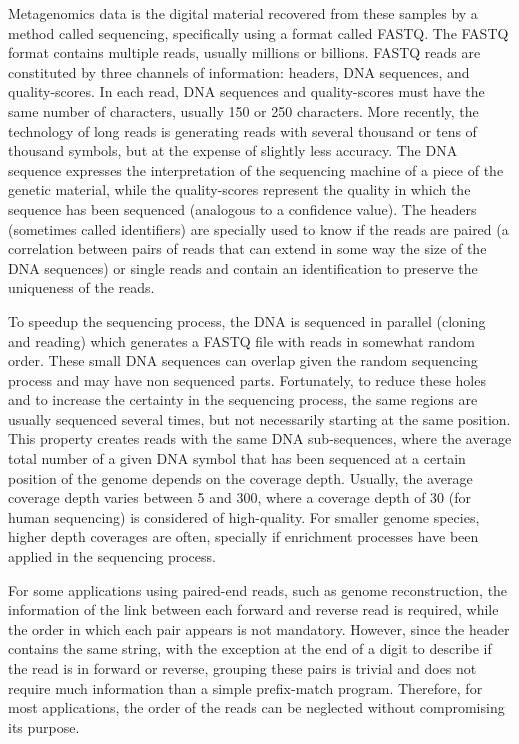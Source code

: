 \documentclass[smallabstract,smallcaptions]{dccpaper}
\begin{document}
Metagenomics data is the digital material recovered from these samples by a method called sequencing, specifically using a format called FASTQ. The FASTQ format contains multiple reads, usually millions or billions. FASTQ reads are constituted by three channels of information: headers, DNA sequences, and quality-scores. In each read, DNA sequences and quality-scores must have the same number of characters, usually 150 or 250 characters. More recently, the technology of long reads is generating reads with several thousand or tens of thousand symbols, but at the expense of slightly less accuracy. The DNA sequence expresses the interpretation of the sequencing machine of a piece of the genetic material, while the quality-scores represent the quality in which the sequence has been sequenced (analogous to a confidence value). The headers (sometimes called identifiers) are specially used to know if the reads are paired (a correlation between pairs of reads that can extend in some way the size of the DNA sequences) or single reads and contain an identification to preserve the uniqueness of the reads. 

To speedup the sequencing process, the DNA is sequenced in parallel (cloning and reading) which generates a FASTQ file with reads in somewhat random order. These small DNA sequences can overlap given the random sequencing process and may have non sequenced parts. Fortunately, to reduce these holes and to increase the certainty in the sequencing process, the same regions are usually sequenced several times, but not necessarily starting at the same position. This property creates reads with the same DNA sub-sequences, where the average total number of a given DNA symbol that has been sequenced at a certain position of the genome depends on the coverage depth. Usually, the average coverage depth varies between 5 and 300, where a coverage depth of 30 (for human sequencing) is considered of high-quality. For smaller genome species, higher depth coverages are often, specially if enrichment processes have been applied in the sequencing process.

For some applications using paired-end reads, such as genome reconstruction, the information of the link between each forward and reverse read is required, while the order in which each pair appears is not mandatory. However, since the header contains the same string, with the exception at the end of a digit to describe if the read is in forward or reverse, grouping these pairs is trivial and does not require much information than a simple prefix-match program. Therefore, for most applications, the order of the reads can be neglected without compromising its purpose.
\end{document}
